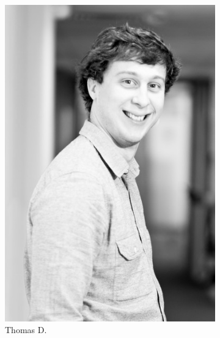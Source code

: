 \begin{figure}[h!]
\begin{subfigure}[b]{0.2\textwidth}
                \includegraphics[width=\textwidth]{images/thomas2-Copier-Copier.jpg}
                \caption{Thomas D.}
            \end{subfigure}
            \begin{subfigure}[b]{0.2\textwidth}

\end{subfigure}
\end{figure}
